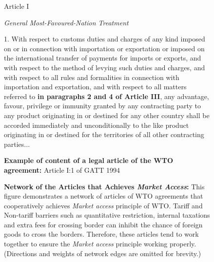 \begin{figure}
    \begin{tightcenter}
        Article I
    \end{tightcenter}
    \begin{tightcenter}
        \textit{General Most-Favoured-Nation Treatment}
    \end{tightcenter}
    1. With respect to customs duties and charges of any kind imposed on or in connection
    with importation or exportation or imposed on the international transfer of payments for
    imports or exports, and with respect to the method of levying such duties and charges, and
    with respect to all rules and formalities in connection with importation and exportation, and
    with respect to all matters referred to \textbf{in paragraphs 2 and 4 of Article III}, any advantage,
    favour, privilege or immunity granted by any contracting party to any product originating in
    or destined for any other country shall be accorded immediately and unconditionally to the
    like product originating in or destined for the territories of all other contracting parties...
    \caption{\textbf{Example of content of a legal article of the WTO agreement:} Article I:1 of GATT 1994}
    \label{fig:gatt_art1}
\end{figure}

\begin{figure}
    \centering{
        
    }
    \caption{{\bf Network of the Articles that Achieves \textit{Market Access}:}
        This figure demonstrates a network of articles of WTO agreements
        that cooperatively achieves \textit{Market access} principle of WTO.
        Tariff and Non-tariff barriers such as quantitative restriction, internal taxations
        and extra fees for crossing border can inhibit the chance of foreign goods to cross the borders.
        Therefore, these articles tend to work together to ensure the \textit{Market access} principle working properly.
        (Directions and weights of network edges are omitted for brevity.)
    }
    \label{fig:market-aceess_directed}
\end{figure}









